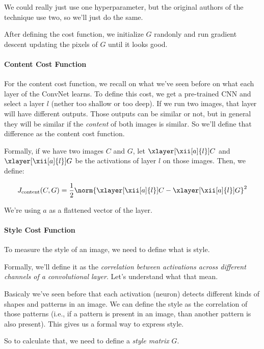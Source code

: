 \documentclass[12pt, a4paper, oneside]{book}
\begin{document}
We could really just use one hyperparameter, but the original authors of the
technique use two, so we'll just do the same.

After defining the cost function, we initialize $G$ randonly and run gradient
descent updating the pixels of $G$ until it looks good.

\paragraph{Content Cost Function}%
\label{par:content_cost_function}

For the content cost function, we recall on what we've seen before on what each
layer of the ConvNet learns. To define this cost, we get a pre-trained CNN and
select a layer $l$ (nether too shallow or too deep). If we run two images, that
layer will have different outputs. Those outputs can be similar or not, but in
general they will be similar if the \textit{content} of both images is similar.
So we'll define that difference as the content cost function.

Formally, if we have two images $C$ and $G$, let $\xlayer[\xii[a]{l}]{C}$ and
$\xlayer[\xii[a]{l}]{G}$ be the activations of layer $l$ on those images. Then,
we define:

\[
J_{\text{content}}(C, G)=\dfrac{1}{2}
\norm{\xlayer[\xii[a]{l}]{C}-\xlayer[\xii[a]{l}]{G}}^2
\]
\begin{obs}
We're using $a$ as a flattened vector of the layer.
\end{obs}

\paragraph{Style Cost Function}%
\label{par:style_cost_function}

To measure the style of an image, we need to define what is style.

Formally, we'll define it as the \textit{correlation between activations across
different channels of a convolutional layer}. Let's understand what that mean.

Basicaly we've seen before that each activation (neuron) detects different kinds
of shapes and patterns in an image. We can define the style as the correlation
of those patterns (i.e., if a pattern is present in an image, than another
pattern is also present). This gives us a formal way to express style.

So to calculate that, we need to define a \textit{style matrix} $G$.
\end{document}
